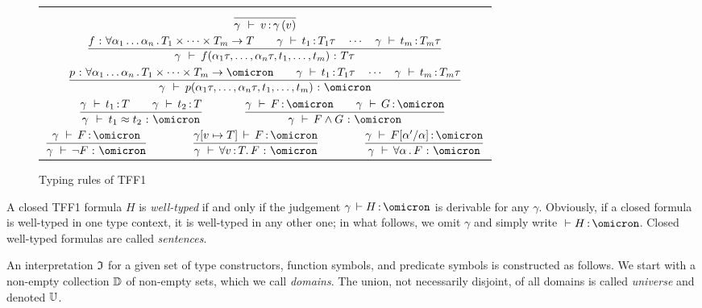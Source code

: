 \begin{figure}
\begin{center}
\begin{tabular}{c@{\qquad\qquad}c}
\multicolumn{2}{c}{$\displaystyle
\frac{}{\gamma\, \:\vdash\: v \operatorname{:} \gamma\,(v)}$} \\[4ex]
\multicolumn{2}{c}{$\displaystyle
\frac{f \,\operatorname{:}\, \forall \alpha_1\dots\alpha_n \,.\,
    T_1 \times \dots \times T_m \to T
\qquad
\gamma\, \,\vdash\, t_1 \operatorname{:} T_1\tau
\quad\cdots\quad
\gamma\, \,\vdash\, t_m \operatorname{:} T_m\tau
}{\gamma\, \:\vdash\:
f(\alpha_1\tau,\dots,\alpha_n\tau,t_1,\dots,t_m) \,\operatorname{:}\, T\tau}
$} \\[4ex]
\multicolumn{2}{c}{$\displaystyle
\frac{p \,\ty\, \forall \alpha_1\dots\alpha_n \,.\,
    T_1 \times \dots \times T_m \to \omicron
\qquad
\gamma\, \,\vdash\, t_1 \ty T_1\tau
\quad\cdots\quad
\gamma\, \,\vdash\, t_m \ty T_m\tau
}{\gamma\, \:\vdash\:
p(\alpha_1\tau,\dots,\alpha_n\tau,t_1,\dots,t_m) \,\ty\, \omicron}
$} \\[4ex]
$\qquad\displaystyle
\frac{\gamma\, \,\vdash\, t_1 \ty T \qquad \gamma\, \,\vdash\, t_2 \ty T}{
\gamma\, \:\vdash\: t_1 \eq t_2 \,\ty\, \omicron}$ &
$\displaystyle
\frac{\gamma\, \,\vdash\, F \ty \omicron \qquad
\gamma\, \,\vdash\, G \ty \omicron}{
\gamma\, \,\vdash\, F \land G \,\ty\, \omicron}\qquad$ \\[4ex]
\multicolumn{2}{c}{
$\displaystyle
\frac{\gamma\, \,\vdash\, F \ty \omicron}{
\gamma\, \,\vdash\, \lnot F \,\ty\, \omicron}\qquad\qquad
\frac{\gamma[v \mapsto T] \,\vdash\, F \ty \omicron}{
\gamma\, \,\vdash\, \forall v \ty T .\, F \,\ty\, \omicron}\qquad\qquad
\frac{\gamma\, \,\vdash\, F[\alpha'/\alpha] \ty \omicron}{
\gamma\, \,\vdash\, \forall \alpha \,.\, F \,\ty\, \omicron}$}
\end{tabular}
\end{center}
\caption{Typing rules of TFF1}
\label{fig:typing}
\end{figure}

A closed TFF1 formula $H$ is {\em well-typed\/} if and only if
the judgement $\gamma\, \vdash H \ty \omicron$ is derivable
for any $\gamma$.
Obviously, if a closed formula is
well-typed in one type context, it is well-typed in any other one;
in what follows, we omit $\gamma$ and simply write
${} \vdash H \ty \omicron$.
Closed well-typed formulas are called {\em sentences}.

An interpretation $\mathfrak{I}$ for a given set of type constructors,
function symbols, and predicate symbols is constructed as follows.
We start with a non-empty collection $\mathbb{D}$ of non-empty sets,
which we call {\em domains}. The union, not necessarily disjoint,
of all domains is called {\em universe\/} and denoted $\mathbb{U}$.

